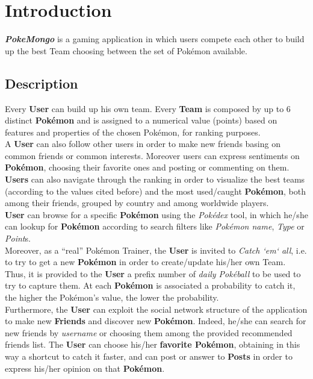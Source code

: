 \section{Introduction}
\textbf{\textit{PokeMongo}} is a gaming application in which users compete each other to build up the best Team choosing between the set of Pokémon available. 

\subsection{Description}
Every \textbf{User} can build up his own team. Every \textbf{Team } is composed by up to 6 distinct \textbf{Pokémon} and is assigned to a numerical value (points) based on features and properties of the chosen Pokémon, for ranking purposes.\medskip \\
A \textbf{User} can also follow other users in order to make new friends basing on common friends or common interests. Moreover users can express sentiments on \textbf{Pokémon}, choosing their favorite ones and posting or commenting on them. \medskip \\
\textbf{Users} can also navigate through the ranking in order to visualize the best teams (according to the values cited before) and the most used/caught \textbf{Pokémon}, both among their friends, grouped by country and among worldwide players.\medskip \\
\textbf{User} can browse for a specific \textbf{Pokémon} using the \textit{Pokédex} tool, in which he/she can lookup for \textbf{Pokémon} according to search filters like \textit{Pokémon name}, \textit{Type} or \textit{Point}s.\medskip \\
Moreover, as a “real” Pokémon Trainer, the \textbf{User} is invited to \textit{Catch ‘em‘ all}, i.e. to try to get a new \textbf{Pokémon } in order to create/update his/her own Team. Thus, it is provided to the \textbf{User} a prefix number of \textit{daily Pokéball} to be used to try to capture them. At each \textbf{Pokémon} is associated a probability to catch it, the higher the Pokémon’s value, the lower the probability.\medskip \\
Furthermore, the \textbf{User} can exploit the social network structure of the application to make new \textbf{Friends} and discover new \textbf{Pokémon}. Indeed, he/she can search for new friends by \textit{username} or choosing them among the provided recommended friends list. 
The \textbf{User} can choose his/her \textbf{favorite Pokémon}, obtaining in this way a shortcut to catch it faster, and can post or answer to \textbf{Posts} in order to express his/her opinion on that \textbf{Pokémon}. \medskip \\
